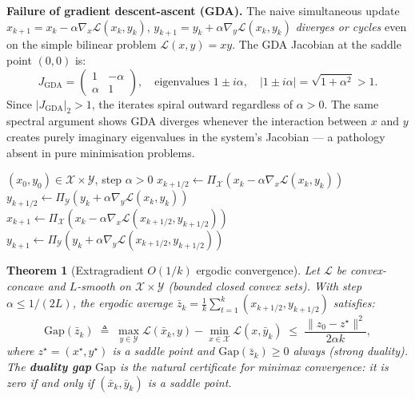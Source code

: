 \documentclass[11pt,a4paper]{article}
\newtheorem{theorem}{Theorem}[section]
\theoremstyle{definition}
\begin{document}
\noindent\textbf{Failure of gradient descent-ascent (GDA).} The naive simultaneous update $x_{k+1} = x_k - \alpha \nabla_x \mathcal{L}(x_k, y_k)$, $y_{k+1} = y_k + \alpha \nabla_y \mathcal{L}(x_k, y_k)$ \emph{diverges or cycles} even on the simple bilinear problem $\mathcal{L}(x,y) = xy$. The GDA Jacobian at the saddle point $(0,0)$ is:
\begin{equation}
J_{\text{GDA}} = \begin{pmatrix} 1 & -\alpha \\ \alpha & 1 \end{pmatrix}, \quad \text{eigenvalues } 1 \pm i\alpha, \quad |1 \pm i\alpha| = \sqrt{1 + \alpha^2} > 1.
\end{equation}
Since $|J_{\text{GDA}}|_2 > 1$, the iterates spiral outward regardless of $\alpha > 0$. The same spectral argument shows GDA diverges whenever the interaction between $x$ and $y$ creates purely imaginary eigenvalues in the system's Jacobian — a pathology absent in pure minimisation problems.

\begin{algorithm}[H]
\caption{Extragradient Method (Korpelevich, 1976)}
\label{alg:extragradient}
\begin{algorithmic}[1]
\Require $(x_0, y_0) \in \mathcal{X} \times \mathcal{Y}$, step $\alpha > 0$
    \State $x_{k+1/2} \gets \Pi_{\mathcal{X}}(x_k - \alpha \nabla_x \mathcal{L}(x_k, y_k))$ 
    \State $y_{k+1/2} \gets \Pi_{\mathcal{Y}}(y_k + \alpha \nabla_y \mathcal{L}(x_k, y_k))$
    \State $x_{k+1} \gets \Pi_{\mathcal{X}}(x_k - \alpha \nabla_x \mathcal{L}(x_{k+1/2}, y_{k+1/2}))$ 
    \State $y_{k+1} \gets \Pi_{\mathcal{Y}}(y_k + \alpha \nabla_y \mathcal{L}(x_{k+1/2}, y_{k+1/2}))$
\EndFor
\end{algorithmic}
\end{algorithm}

\begin{theorem}[Extragradient $O(1/k)$ ergodic convergence]
Let $\mathcal{L}$ be convex-concave and $L$-smooth on $\mathcal{X} \times \mathcal{Y}$ (bounded closed convex sets). With step $\alpha \leq 1/(2L)$, the ergodic average $\bar{z}_k = \frac{1}{k}\sum_{t=1}^k (x_{k+1/2}, y_{k+1/2})$ satisfies:
\begin{equation}
\text{Gap}(\bar{z}_k) \;\triangleq\; \max_{y \in \mathcal{Y}}\mathcal{L}(\bar{x}_k, y) - \min_{x \in \mathcal{X}}\mathcal{L}(x, \bar{y}_k) \;\leq\; \frac{\|z_0 - z^{\star}\|^2}{2\alpha k},
\label{eq:eg_convergence}
\end{equation}
where $z^{\star} = (x^{\star}, y^{\star})$ is a saddle point and $\text{Gap}(\bar{z}_k) \geq 0$ always (strong duality). The \textbf{duality gap} $\text{Gap}$ is the natural certificate for minimax convergence: it is zero if and only if $(\bar{x}_k, \bar{y}_k)$ is a saddle point.
\end{theorem}
\end{document}
